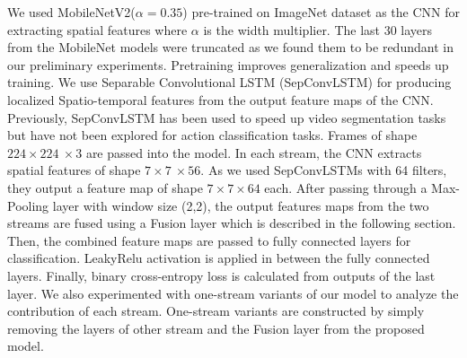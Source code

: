 \documentclass[conference]{IEEEtran}
\begin{document}
We used MobileNetV2(\(\alpha=0.35\)) \cite{sandler2018mobilenetv2} pre-trained on ImageNet dataset \cite{krizhevsky2012imagenet} as the CNN for extracting spatial features where \(\alpha\) is the width multiplier. The last 30 layers from the MobileNet models were truncated as we found them to be redundant in our preliminary experiments. Pretraining improves generalization and speeds up training. We use Separable Convolutional LSTM (SepConvLSTM) for producing localized Spatio-temporal features from the output feature maps of the CNN. Previously, SepConvLSTM has been used to speed up video segmentation tasks \cite{pfeuffer2019separable} but have not been explored for action classification tasks. Frames of shape \(224 \times 224\ \times 3\) are passed into the model. In each stream, the CNN extracts spatial features of shape \(7 \times 7\ \times 56\). As we used SepConvLSTMs with 64 filters, they output a feature map of shape \(7 \times 7\times 64\) each. After passing through a Max-Pooling layer with window size (2,2), the output features maps from the two streams are fused using a Fusion layer which is described in the following section. Then, the combined feature maps are passed to fully connected layers for classification. LeakyRelu \cite{xu2015empirical} activation is applied in between the fully connected layers. Finally, binary cross-entropy loss is calculated from outputs of the last layer.
We also experimented with one-stream variants of our model to analyze the contribution of each stream. One-stream variants are constructed by simply removing the layers of other stream and the Fusion layer from the proposed model.
\end{document}
